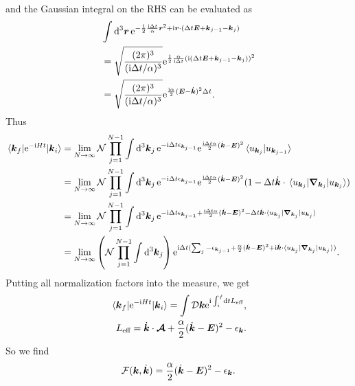 \documentclass[hyperref, a4paper]{article}
\newcommand*{\ii}{\mathrm{i}}
\newcommand*{\ee}{\mathrm{e}}
\begin{document}
\begin{itemize}
\[\begin{aligned}
    \end{aligned}
\]
and the Gaussian integral on the RHS can be evaluated as 
\[
    \begin{aligned}
        &\int \dd[3]{\vb*{r}} \ee^{- \frac{1}{2} \frac{\ii \Delta t}{\alpha} \vb*{r}^2 + \ii \vb*{r} \cdot (\Delta t \vb*{E} + \vb*{k}_{j-1} - \vb*{k}_j) }  \\
        &= \sqrt{\frac{(2\pi)^3}{(\ii \Delta t / \alpha)^3}} \ee^{\frac{1}{2} \frac{\alpha}{\ii \Delta t} (\ii (\Delta t \vb*{E} + \vb*{k}_{j-1} - \vb*{k}_j))^2 } \\
        &= \sqrt{\frac{(2\pi)^3}{(\ii \Delta t / \alpha)^3}} \ee^{ \frac{\ii \alpha}{2} (\vb*{E} - \dot{\vb*{k}})^2 \Delta t }.
    \end{aligned}
\]
Thus 
\[
    \begin{aligned}
        \mel{\vb*{k}_f}{\ee^{- \ii H t}}{\vb*{k}_i} &= \lim_{N \to \infty} \mathcal{N} \prod_{j=1}^{N-1} 
        \int \dd[3]{\vb*{k}_j} \ee^{- \ii \Delta t \epsilon_{\vb*{k}_{j-1}}} \ee^{\frac{\ii \Delta t \alpha}{2} (\dot{\vb*{k}} - \vb*{E})^2}
        \braket*{u_{\vb*{k}_j}}{u_{\vb*{k}_{j-1}}} \\
        &= \lim_{N \to \infty} \mathcal{N} \prod_{j=1}^{N-1} 
        \int \dd[3]{\vb*{k}_j} \ee^{- \ii \Delta t \epsilon_{\vb*{k}_{j-1}}} \ee^{\frac{\ii \Delta t \alpha}{2} (\dot{\vb*{k}} - \vb*{E})^2}
        (1 - \Delta t \dot{\vb*{k}} \cdot \mel*{u_{\vb*{k}_{j}}}{\grad_{\vb*{k}_{j}}}{u_{\vb*{k}_{j}}}) \\
        &= \lim_{N \to \infty} \mathcal{N} \prod_{j=1}^{N-1} 
        \int \dd[3]{\vb*{k}_j} \ee^{- \ii \Delta t \epsilon_{\vb*{k}_{j-1}} + \frac{\ii \Delta t \alpha}{2} (\dot{\vb*{k}} - \vb*{E})^2 - \Delta t \dot{\vb*{k}} \cdot \mel*{u_{\vb*{k}_{j}}}{\grad_{\vb*{k}_{j}}}{u_{\vb*{k}_{j}}}} \\
        &= \lim_{N \to \infty}  \left(\mathcal{N} \prod_{j=1}^{N-1} 
        \int \dd[3]{\vb*{k}_j}\right) \ee^{\ii \Delta t (\sum_{j} - \epsilon_{\vb*{k}_{j-1}} + \frac{ \alpha}{2} (\dot{\vb*{k}} - \vb*{E})^2 + \ii \dot{\vb*{k}} \cdot \mel*{u_{\vb*{k}_{j}}}{\grad_{\vb*{k}_{j}}}{u_{\vb*{k}_{j}}})}.
    \end{aligned}
\]
Putting all normalization factors into the measure, we get 
\begin{equation}
    \begin{aligned}
        \mel{\vb*{k}_f}{\ee^{- \ii H t}}{\vb*{k}_i} = \int \mathcal{D} \vb*{k} \ee^{\ii \int_i^f \dd{t} L_{\text{eff}}}, \\
        L_{\text{eff}} = \dot{\vb*{k}} \cdot \vb*{\mathcal{A}} + \frac{\alpha}{2} (\dot{\vb*{k}} - \vb*{E})^2 - \epsilon_{\vb*{k}}.
    \end{aligned}
\end{equation}
So we find 
\begin{equation}
    \mathcal{F}(\vb*{k}, \dot{\vb*{k}}) = \frac{\alpha}{2} (\dot{\vb*{k}} - \vb*{E})^2 - \epsilon_{\vb*{k}}.
\end{equation}


\end{itemize}
\end{document}
